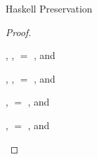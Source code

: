 \begin{theorem}{Haskell Preservation}
\begin{proof}
\begin{case}{\osfix}
\end{case}


\begin{case}{\osadd}

\pnpremise
{\judeh{}{\osaddl}{\first{\vartyh}}}
\pntypes
{
\judeh{}{\first{\expnum{\varnum}}}{\tynum},
\judeh{}{\second{\expnum{\varnum}}}{\tynum},
\first{\vartyh} $=$ \tynum, and
\judeh{}{\osaddr}{\tynum}
}

\end{case}


\begin{case}{\ossub}

\pnpremise
{\judeh{}{\ossubl}{\first{\vartyh}}}
\pntypes
{
\judeh{}{\first{\expnum{\varnum}}}{\tynum},
\judeh{}{\second{\expnum{\varnum}}}{\tynum},
\first{\vartyh} $=$ \tynum, and
\judeh{}{\ossubr}{\tynum}
}

\end{case}


\begin{case}{\osiftrue}

\pnpremise
{\judeh{\env}{\osiftruel}{\first{\vartyh}}}
\pntypes
{
\judeh{\env}{\osiftruer}{\first{\vartyh}}
}

\end{case}


\begin{case}{\osiffalse}

\pnpremise
{\judeh{\env}{\osiffalsel}{\first{\vartyh}}}
\pntypes
{
\judeh{\env}{\osiffalser}{\first{\vartyh}}
}

\end{case}


\begin{case}{\oshdnil}

\pnpremise
{\judeh{\env}{\oshdnill}{\second{\vartyh}}}
\pntypes
{
\judeh{\env}{\expnils{\first{\vartyh}}}{\tylist{\first{\vartyh}}},
\second{\vartyh} $=$ \first{\vartyh}, and
\judeh{\env}{\oshdnilr}{\first{\vartyh}}
}

\end{case}


\begin{case}{\ostlnil}

\pnpremise
{\judeh{\env}{\ostlnill}{\second{\vartyh}}}
\pntypes
{
\judeh{\env}{\expnils{\first{\vartyh}}}{\tylist{\first{\vartyh}}},
\second{\vartyh} $=$ \tylist{\first{\vartyh}}, and
\judeh{\env}{\ostlnilr}{\tylist{\first{\vartyh}}}
}


\end{case}
\end{proof}
\end{theorem}
